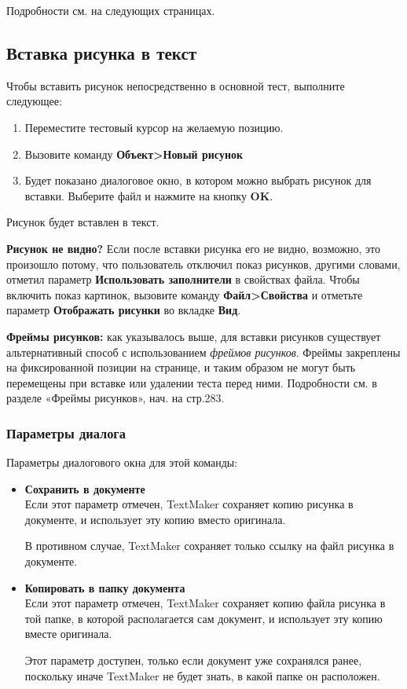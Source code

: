 ﻿\documentclass[a4paper,10pt]{article}
\begin{document}
Подробности см. на следующих страницах.

\subsection{Вставка рисунка в текст}
Чтобы вставить рисунок непосредственно в основной тест, выполните следующее:

\begin{enumerate}
 \item Переместите тестовый курсор на желаемую позицию.
 \item Вызовите команду \textbf{Объект>Новый рисунок}
 \item Будет показано диалоговое окно, в котором можно выбрать рисунок для вставки. Выберите файл и нажмите на кнопку \textbf{OK}.
\end{enumerate}

Рисунок будет вставлен в текст.

\textbf{Рисунок не видно?} Если после вставки рисунка его не видно, возможно, это произошло потому, что пользователь отключил показ рисунков, другими словами, отметил параметр \textbf{Использовать заполнители} в свойствах файла. Чтобы включить показ картинок, вызовите команду \textbf{Файл>Свойства} и отметьте параметр \textbf{Отображать рисунки} во вкладке \textbf{Вид}.

\textbf{Фреймы рисунков:} как указывалось выше, для вставки рисунков существует альтернативный способ с использованием \textit{фреймов рисунков}. Фреймы закреплены на фиксированной позиции на странице, и таким образом не могут быть перемещены при вставке или удалении теста перед ними. Подробности см. в разделе «Фреймы рисунков», нач. на стр.283.

\subsubsection{Параметры диалога}
Параметры диалогового окна для этой команды:
\begin{itemize}
 \item \textbf{Сохранить в документе}\\
 Если этот параметр отмечен, TextMaker сохраняет копию рисунка в документе, и использует эту копию вместо оригинала.
 
 В противном случае, TextMaker сохраняет только ссылку на файл рисунка в документе.
 \item \textbf{Копировать в папку документа}\\
 Если этот параметр отмечен, TextMaker сохраняет копию файла рисунка в той папке, в которой располагается сам документ, и использует эту копию вместе оригинала.
 
 Этот параметр доступен, только если документ уже сохранялся ранее, поскольку иначе TextMaker не будет знать, в какой папке он расположен.
\end{itemize}
\end{document}
